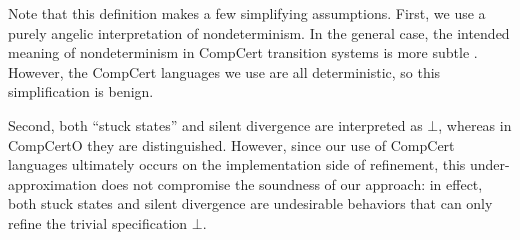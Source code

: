 \documentclass[acmsmall,review,anonymous]{acmart}\settopmatter{printfolios=true,printccs=false,printacmref=false}
\begin{document}
Note that this definition makes a few simplifying assumptions.
First,
we use a purely angelic interpretation of nondeterminism.
In the general case,
the intended meaning of nondeterminism in CompCert transition systems
is more subtle \cite[\S8.1]{thesis}.
However,
the CompCert languages we use are all deterministic,
so this simplification is benign.

Second,
both ``stuck states'' and silent divergence
are interpreted as $\bot$,
whereas in CompCertO they are distinguished.
However,
since our use of CompCert languages
ultimately occurs on the implementation side of refinement,
this under-approximation does not compromise
the soundness of our approach:
in effect,
both stuck states and silent divergence
are undesirable behaviors that can 
only refine the trivial specification $\bot$.

\end{document}
